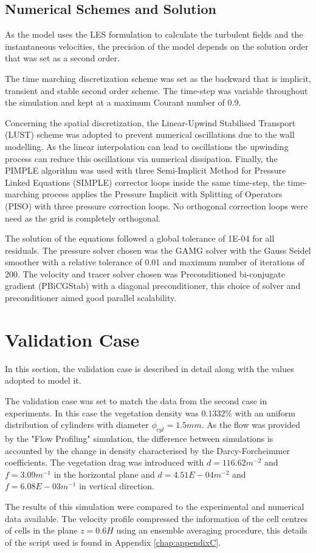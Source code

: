 \documentclass[../main.tex]{subfiles}
\begin{document}
\subsection{Numerical Schemes and Solution}
As the model uses the LES formulation to calculate the turbulent fields and the instantaneous velocities, the precision of the model depends on the solution order that was set as a second order.

The time marching discretization scheme was set as the backward that is implicit, transient and stable second order scheme. The time-step was variable throughout the simulation and kept at a maximum Courant number of 0.9.

Concerning the spatial discretization, the Linear-Upwind Stabilised Transport (LUST) scheme was adopted to prevent numerical oscillations due to the wall modelling. As the linear interpolation can lead to oscillations the upwinding process can reduce this oscillations via numerical dissipation. Finally, the PIMPLE algorithm was used with three Semi-Implicit Method for Pressure Linked Equations (SIMPLE) corrector loops inside the same time-step, the time-marching process applies the Pressure Implicit with Splitting of Operators (PISO) with three pressure correction loops. No orthogonal correction loops were need as the grid is completely orthogonal.

The solution of the equations followed a global tolerance of 1E-04 for all residuals. The pressure solver chosen was the GAMG solver with the Gauss Seidel smoother with a relative tolerance of 0.01 and maximum number of iterations of 200. The velocity and tracer solver chosen was Preconditioned bi-conjugate gradient (PBiCGStab)  with a diagonal preconditioner, this choice of solver and preconditioner aimed good parallel scalability.

\section{Validation Case}
In this section, the validation case is described in detail along with the values adopted to model it.

The validation case was set to match the data from the second case in \textcite{xiang2019} experiments. In this case the vegetation density was $0.1332\%$ with an uniform distribution of cylinders with diameter $\phi_{cyl}=1.5 mm$. As the flow was provided by the "Flow Profiling" simulation, the difference between simulations is accounted by the change in density characterised by the Darcy-Forcheimmer coefficients. The vegetation drag was introduced with $d=116.62m^{-2}$ and $f=3.09 m^{-1}$ in the horizontal plane and $d=4.51E-04 m^{-2}$ and $f=6.08E-03 m^{-1}$ in vertical direction.

The results of this simulation were compared to the experimental and numerical data available. The velocity profile compressed the information of the cell centres of cells in the plane $z=0.6H$ using an ensemble averaging procedure, this details of the script used is found in Appendix \ref{chap:appendixC}.
\end{document}
